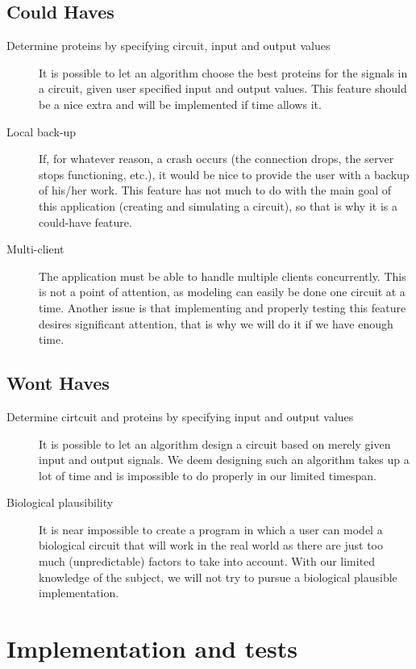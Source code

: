 \documentclass[a4paper]{article}
\begin{document}
\subsection{Could Haves}
\begin{description}
\item[Determine proteins by specifying circuit, input and output values] It is possible to let an algorithm choose the best proteins for the signals in a circuit, given user specified input and output values. This feature should be a nice extra and will be implemented if time allows it.
\item[Local back-up] If, for whatever reason, a crash occurs (the connection drops, the server stops functioning, etc.), it would be nice to provide the user with a backup of his/her work. This feature has not much to do with the main goal of this application (creating and simulating a circuit), so that is why it is a could-have feature.
\item[Multi-client] The application must be able to handle multiple clients concurrently. This is not a point of attention, as modeling can easily be done one circuit at a time. Another issue is that implementing and properly testing this feature desires significant attention, that is why we will do it if we have enough time.
\end{description}

\subsection{Wont Haves}
\begin{description}
\item[Determine cirtcuit and proteins by specifying input and output values] It is possible to let an algorithm design a circuit based on merely given input and output signals. We deem designing such an algorithm takes up a lot of time and is impossible to do properly in our limited timespan.
\item[Biological plausibility] It is near impossible to create a program in which a user can model a biological circuit that will work in the real world as there are just too much (unpredictable) factors to take into account. With our limited knowledge of the subject, we will not try to pursue a biological plausible implementation.
\end{description}

\section{Implementation and tests}
\end{document}

